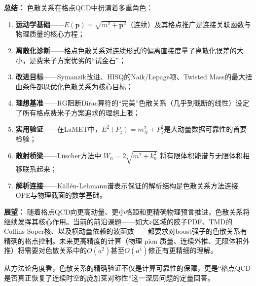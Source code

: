 \documentclass[12pt,a4paper]{ctexart}
\theoremstyle{definition}
\begin{document}
\textbf{总结：} 色散关系在格点QCD中扮演着多重角色：

\begin{enumerate}[leftmargin=*]
    \item \textbf{运动学基础}——$E(\mathbf{p}) = \sqrt{m^2 + \mathbf{p}^2}$（连续）及其格点推广是连接关联函数与物理质量的核心方程；
    \item \textbf{离散化诊断}——格点色散关系对连续形式的偏离直接度量了离散化误差的大小，是费米子方案优劣的``试金石''；
    \item \textbf{改进目标}——Symanzik改进、HISQ的Naik/Lepage项、Twisted Mass的最大扭曲条件都以优化色散关系为核心目标；
    \item \textbf{理想基准}——RG阻断Dirac算符的``完美''色散关系（几乎到截断的线性）设定了所有格点费米子方案追求的理想上限；
    \item \textbf{实用验证}——在LaMET中，$E^2(P_z) = m_N^2 + P_z^2$是大动量数据可靠性的首要检验；
    \item \textbf{散射桥梁}——L\"uscher方法中 $W_n = 2\sqrt{m^2 + k_n^2}$ 将有限体积能谱与无限体积相移联系起来；
    \item \textbf{解析连接}——K\"all\'en-Lehmann谱表示保证的解析结构是色散关系方法连接OPE与物理截面的数学基础。
\end{enumerate}

\textbf{展望：} 随着格点QCD向更高动量、更小格距和更精确物理预言推进，色散关系将继续发挥其核心作用。当前的前沿课题——如大$x$区域的胶子PDF、TMD的Collins-Soper核、以及横动量依赖的波函数——都要求对boost强子的色散关系有精确的格点控制。未来更高精度的计算（物理 pion 质量、连续外推、无限体积外推）将需要对色散关系中的$O(a^2)$甚至$O(a^4)$修正有更精细的理解。

从方法论角度看，色散关系的精确验证不仅是计算可靠性的保障，更是``格点QCD是否真正恢复了连续时空的庞加莱对称性''这一深层问题的定量回答。

\end{document}
